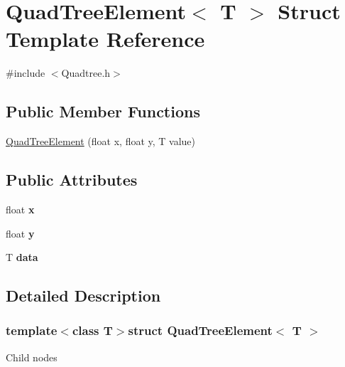 \hypertarget{struct_quad_tree_element}{\section{Quad\-Tree\-Element$<$ T $>$ Struct Template Reference}
\label{struct_quad_tree_element}
}


{\ttfamily \#include $<$Quadtree.\-h$>$}

\subsection*{Public Member Functions}
\begin{DoxyCompactItemize}
\item 
\hyperlink{struct_quad_tree_element_afc10177fd3e474ae52bed94a836f6a53}{Quad\-Tree\-Element} (float x, float y, T value)
\end{DoxyCompactItemize}
\subsection*{Public Attributes}
\begin{DoxyCompactItemize}
\item 
\hypertarget{struct_quad_tree_element_adcac4c3df6bed83eca37b1f75992dba3}{float {\bfseries x}}\label{struct_quad_tree_element_adcac4c3df6bed83eca37b1f75992dba3}

\item 
\hypertarget{struct_quad_tree_element_a16dcca0a119531f2e76aa7f534a6b30b}{float {\bfseries y}}\label{struct_quad_tree_element_a16dcca0a119531f2e76aa7f534a6b30b}

\item 
\hypertarget{struct_quad_tree_element_a0234942902e1938a4cb15e814939f905}{T {\bfseries data}}\label{struct_quad_tree_element_a0234942902e1938a4cb15e814939f905}

\end{DoxyCompactItemize}


\subsection{Detailed Description}
\subsubsection*{template$<$class T$>$struct Quad\-Tree\-Element$<$ T $>$}

Child nodes 


